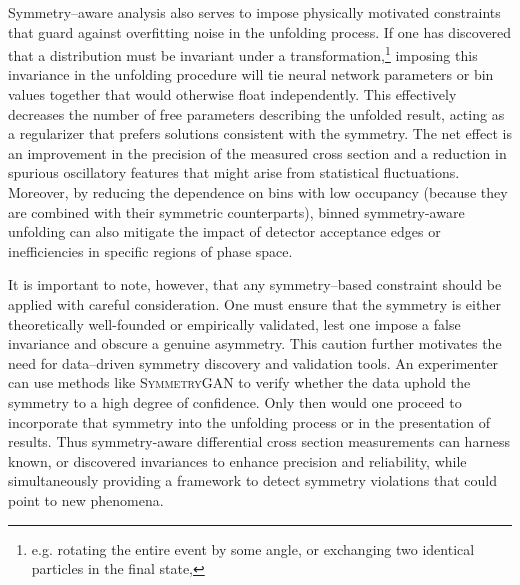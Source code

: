         Symmetry--aware analysis also serves to impose physically motivated constraints that guard against overfitting noise in the unfolding process.
        If one has discovered that a distribution must be invariant under a transformation,\footnote{e.g. rotating the entire event by some angle, or exchanging two identical particles in the final state,} imposing this invariance in the unfolding procedure will tie neural network parameters or bin values together that would otherwise float independently.
        This effectively decreases the number of free parameters describing the unfolded result, acting as a regularizer that prefers solutions consistent with the symmetry.
        The net effect is an improvement in the precision of the measured cross section and a reduction in spurious oscillatory features that might arise from statistical fluctuations.
        Moreover, by reducing the dependence on bins with low occupancy (because they are combined with their symmetric counterparts), binned symmetry-aware unfolding can also mitigate the impact of detector acceptance edges or inefficiencies in specific regions of phase space.

        It is important to note, however, that any symmetry--based constraint should be applied with careful consideration. One must ensure that the symmetry is either theoretically well-founded or empirically validated, lest one impose a false invariance and obscure a genuine asymmetry.
        This caution further motivates the need for data--driven symmetry discovery and validation tools.
        An experimenter can use methods like \textsc{SymmetryGAN} to verify whether the data uphold the symmetry to a high degree of confidence.
        Only then would one proceed to incorporate that symmetry into the unfolding process or in the presentation of results.
        Thus symmetry-aware differential cross section measurements can harness known, or discovered invariances to enhance precision and reliability, while simultaneously providing a framework to detect symmetry violations that could point to new phenomena.
    
